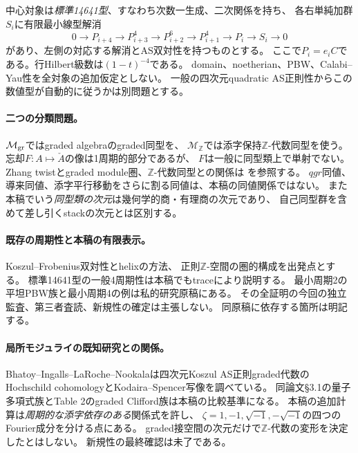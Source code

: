 \documentclass[11pt,a4paper]{ltjsarticle}
\theoremstyle{definition}
\newcommand{\ZZ}{\mathbb Z}
\begin{document}
中心対象は\emph{標準14641型}、すなわち次数一生成、二次関係を持ち、
各右単純加群$S_i$に有限最小線型解消
\begin{equation}\label{eq:standard-resolution}
0\longrightarrow P_{i+4}\longrightarrow P_{i+3}^{4}
\longrightarrow P_{i+2}^{6}\longrightarrow P_{i+1}^{4}
\longrightarrow P_i\longrightarrow S_i\longrightarrow0
\end{equation}
があり、左側の対応する解消とAS双対性を持つものとする。
ここで$P_i=e_iC$である。行Hilbert級数は$(1-t)^{-4}$である。
domain、noetherian、PBW、Calabi--Yau性を全対象の追加仮定としない。
一般の四次元quadratic AS正則性からこの数値型が自動的に従うかは別問題とする。

\paragraph{二つの分類問題。}
$\mathcal M_{\rm gr}$ではgraded algebraのgraded同型を、
$\mathcal M_{\ZZ}$では添字保持$\ZZ$-代数同型を使う。
忘却$F:A\mapsto\check A$の像は1周期的部分であるが、
$F$は一般に同型類上で単射でない。
Zhang twistとgraded module圏、$\ZZ$-代数同型との関係は
\cite{Zhang,Sierra,VdB}を参照する。
$qgr$同値、導来同値、添字平行移動をさらに割る同値は、本稿の同値関係ではない。
また本稿でいう\emph{同型類の次元}は幾何学的商・有理商の次元であり、
自己同型群を含めて差し引くstackの次元とは区別する。

\paragraph{既存の周期性と本稿の有限表示。}
Koszul--Frobenius双対性とhelixの方法\cite{BP}、
正則$\ZZ$-空間の圏的構成\cite{MoriNyman}を出発点とする。
標準14641型の一般4周期性は本稿でもtraceにより説明する。
最小周期2の平坦PBW族と最小周期4の例は私的研究原稿\cite{as4period}にある。
その全証明の今回の独立監査、第三者査読、新規性の確定は主張しない。
同原稿に依存する箇所は明記する。

\paragraph{局所モジュライの既知研究との関係。}
Bhatoy--Ingalls--LaRoche--Nookala\cite{BILN}は四次元Koszul AS正則graded代数の
Hochschild cohomologyとKodaira--Spencer写像を調べている。
同論文\S3.1の量子多項式族とTable 2のgraded Clifford族は本稿の比較基準になる。
本稿の追加計算は\emph{周期的な添字依存のある}関係式を許し、
$\zeta=1,-1,\sqrt{-1},-\sqrt{-1}$の四つのFourier成分を分ける点にある。
graded接空間の次元だけで$\ZZ$-代数の変形を決定したとはしない。
新規性の最終確認は未了である。
\end{document}
